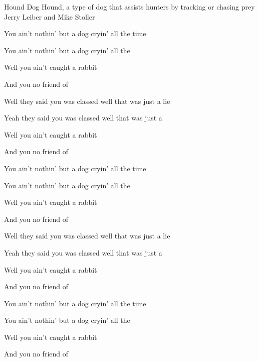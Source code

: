 \begin{SBSong}{Hound Dog}
  {Hound, a type of dog that assists hunters by tracking or chasing prey}
  {Jerry Leiber and Mike Stoller}
  \begin{SBVerse}
    You ain't nothin' but a  dog cryin' all the time 
    
    You ain't nothin' but a  dog cryin' all the 
    
    Well you ain't  caught a rabbit 
    
    And you  no friend of   
  \end{SBVerse}
  \begin{SBVerse}
    Well they said you was  classed well that was just a lie 
    
    Yeah they said you was  classed well that was just a  
    
    Well you ain't  caught a rabbit 
    
    And you  no friend of   
  \end{SBVerse}
  \begin{SBVerse}
    You ain't nothin' but a  dog cryin' all the time 
    
    You ain't nothin' but a  dog cryin' all the 
    
    Well you ain't  caught a rabbit 
    
    And you  no friend of   
  \end{SBVerse}
  \begin{SBVerse}
    Well they said you was  classed well that was just a lie 
    
    Yeah they said you was  classed well that was just a  
    
    Well you ain't  caught a rabbit 
    
    And you  no friend of   
  \end{SBVerse}
  \begin{SBVerse}
    You ain't nothin' but a  dog cryin' all the time 
    
    You ain't nothin' but a  dog cryin' all the 
    
    Well you ain't  caught a rabbit 
    
    And you  no friend of   
  \end{SBVerse}
\end{SBSong}                                                                                                    